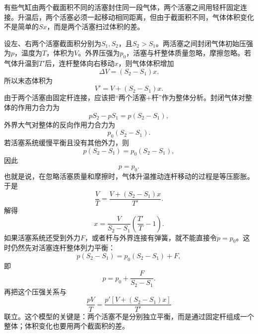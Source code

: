 \begin{casetypebox}[title={\strut\textcolor{white}{\bfseries 常见题型：不同截面积双活塞连杆}}]
有些气缸由两个截面积不同的活塞封住同一段气体，两个活塞之间用轻杆固定连接。升温后，两个活塞必须一起移动相同距离，但由于截面积不同，气体体积变化不是简单的$Sx$，而是两个活塞扫过体积的差。\\
\begin{center}
\end{center}
设左、右两个活塞截面积分别为$S_1,S_2$，且$S_2>S_1$。两活塞之间封闭气体初始压强为$p$，温度为$T$，体积为$V$。外界压强为$p_0$，活塞与杆整体质量忽略，摩擦忽略。若气体升温到$T'$后，连杆整体向右移动$x$，则气体体积增加
\[
  \Delta V=(S_2-S_1)x.
\]
所以末态体积为
\[
  V'=V+(S_2-S_1)x.
\]
由于两个活塞由固定杆连接，应该把“两个活塞+杆”作为整体分析。封闭气体对整体的作用力合力为
\[
  pS_2-pS_1=p(S_2-S_1),
\]
外界大气对整体的反向作用力合力为
\[
  p_0(S_2-S_1).
\]
若活塞系统缓慢平衡且没有其他外力，则
\[
  p(S_2-S_1)=p_0(S_2-S_1),
\]
因此
\[
  p=p_0.
\]
也就是说，在忽略活塞质量和摩擦时，气体升温推动连杆移动的过程是等压膨胀。于是
\[
  \frac{V}{T}=\frac{V+(S_2-S_1)x}{T'}.
\]
解得
\[
  x=\frac{V}{S_2-S_1}\left(\frac{T'}{T}-1\right).
\]
如果活塞系统还受到外力$F$，或者杆与外界连接有弹簧，就不能直接令$p=p_0$。这时仍然先对活塞连杆整体列力平衡：
\[
  p(S_2-S_1)=p_0(S_2-S_1)+F,
\]
即
\[
  p=p_0+\frac{F}{S_2-S_1}.
\]
再把这个压强关系与
\[
  \frac{pV}{T}=\frac{p'\left[V+(S_2-S_1)x\right]}{T'}
\]
联立。这个模型的关键是：两个活塞不是分别独立平衡，而是通过固定杆组成一个整体；体积变化也要用两个截面积的差。
\end{casetypebox}
